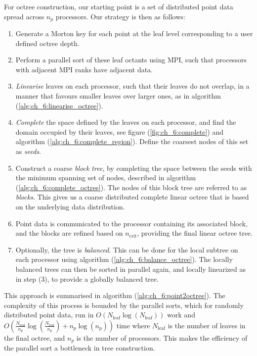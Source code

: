 For octree construction, our starting point is a set of distributed point data spread across $n_p$ processors. Our strategy is then as follows:

\begin{enumerate}
    \item Generate a Morton key for each point at the leaf level corresponding to a user defined octree depth.
    \item Perform a parallel sort of these leaf octants using MPI, such that processors with adjacent MPI ranks have adjacent data.
    \item \textit{Linearise} leaves on each processor, such that their leaves do not overlap, in a manner that favours smaller leaves over larger ones, as in algorithm (\ref{alg:ch_6:linearise_octree}). 
    \item \textit{Complete} the space defined by the leaves on each processor, and find the domain occupied by their leaves, see figure (\ref{fig:ch_6:complete}) and algorithm (\ref{alg:ch_6:complete_region}). Define the coarsest nodes of this set as \textit{seeds}.
    \item Construct a coarse \textit{block tree}, by completing the space between the seeds with the minimum spanning set of nodes, described in algorithm (\ref{alg:ch_6:complete_octree}). The nodes of this block tree are referred to as \textit{blocks}. This gives us a coarse distributed complete linear octree that is based on the underlying data distribution.
    \item Point data is communicated to the processor containing its associated block, and the blocks are refined based on $n_{\text{crit}}$, providing the final linear octree tree.
    \item Optionally, the tree is \textit{balanced}. This can be done for the local subtree on each processor using algorithm (\ref{alg:ch_6:balance_octree}). The locally balanced trees can then be sorted in parallel again, and locally linearized as in step (3), to provide a globally balanced tree.
\end{enumerate}

This approach is summarised in algorithm (\ref{alg:ch_6:point2octree}). The complexity of this process is bounded by the parallel sorts, which for randomly distributed point data, run in $O(N_{\text{leaf}} \log (N_{\text{leaf}}))$ work and $O(\frac{N_{\text{leaf}}}{n_p} \log(\frac{N_{\text{leaf}}}{n_p}) + n_p \log (n_p))$ time where $N_{\text{leaf}}$ is the number of leaves in the final octree, and $n_p$ is the number of processors. This makes the efficiency of the parallel sort a bottleneck in tree construction.

